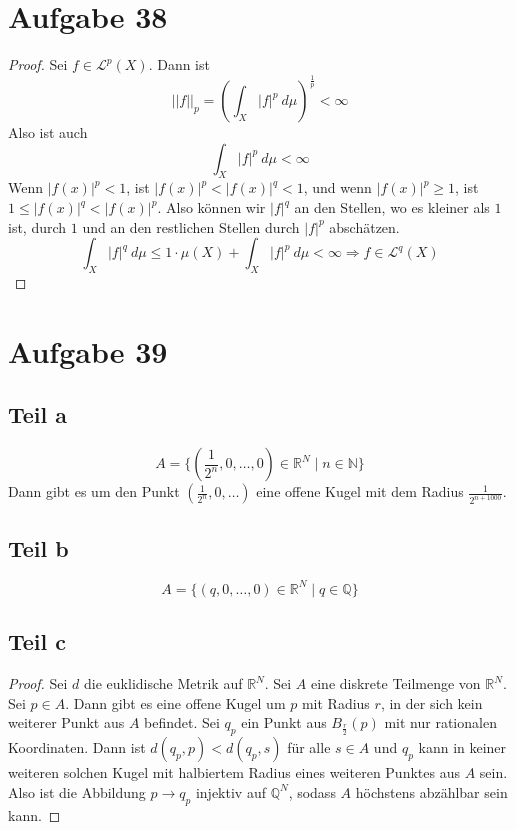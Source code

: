 \documentclass[10pt,a4paper]{article}
\begin{document}
\section{Aufgabe 38}
\begin{proof}
  Sei $f \in \mathscr{L}^{p}(X)$.
  Dann ist
  \begin{equation}
    ||f||_{p} = \left( \int_{X} |f|^{p}\ d\mu \right)^{\frac{1}{p}} < \infty
  \end{equation}
  Also ist auch
  \begin{equation}
    \int_{X} |f|^{p}\ d\mu < \infty
  \end{equation}
  Wenn $|f(x)|^{p} < 1$, ist $|f(x)|^{p} < |f(x)|^{q} < 1$, und wenn $|f(x)|^{p} \ge 1$, ist $1 \le |f(x)|^{q} < |f(x)|^{p}$.
  Also können wir $|f|^{q}$ an den Stellen, wo es kleiner als $1$ ist, durch $1$ und an den restlichen Stellen durch $|f|^{p}$ abschätzen.
  \begin{equation}
    \int_{X} |f|^{q}\ d\mu \le 1 \cdot \mu(X) + \int_{X} |f|^{p}\ d\mu < \infty \Rightarrow f \in \mathscr{L}^{q}(X)
  \end{equation}
\end{proof}

\section{Aufgabe 39}

\subsection{Teil a}
\begin{equation}
  A = \{ (\frac{1}{2^{n}}, 0, \dots, 0) \in \mathbb{R}^{N} \mid n \in \mathbb{N} \}
\end{equation}
Dann gibt es um den Punkt $(\frac{1}{2^{n}}, 0, \dots)$ eine offene Kugel mit dem Radius $\frac{1}{2^{n + 1000}}$.

\subsection{Teil b}
\begin{equation}
  A = \{ (q, 0, \dots, 0) \in \mathbb{R}^{N} \mid q \in \mathbb{Q} \}
\end{equation}

\subsection{Teil c}
\begin{proof}
  Sei $d$ die euklidische Metrik auf $\mathbb{R}^N$.
  Sei $A$ eine diskrete Teilmenge von $\mathbb{R}^{N}$.
  Sei $p \in A$.
  Dann gibt es eine offene Kugel um $p$ mit Radius $r$, in der sich kein weiterer Punkt aus $A$ befindet.
  Sei $q_{p}$ ein Punkt aus $B_{\frac{r}{2}}(p)$ mit nur rationalen Koordinaten.
  Dann ist $d(q_{p}, p) < d(q_{p}, s)$ für alle $s \in A$ und $q_{p}$ kann in keiner weiteren solchen Kugel mit halbiertem Radius eines weiteren Punktes aus $A$ sein.
  Also ist die Abbildung $p \rightarrow q_{p}$ injektiv auf $\mathbb{Q}^{N}$, sodass $A$ höchstens abzählbar sein kann.
\end{proof}
\end{document}
